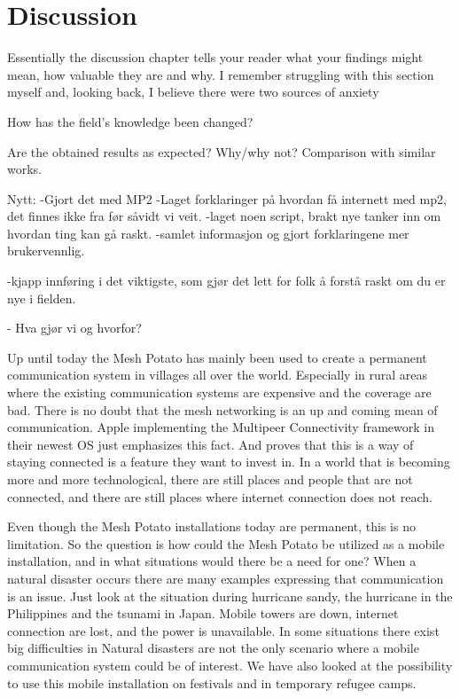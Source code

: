 \chapter{Discussion}
\label{chp:discussion} 

Essentially the discussion chapter tells your reader what your findings might mean, how valuable they are and why. I remember struggling with this section myself and, looking back, I believe there were two sources of anxiety

How has the field's knowledge been changed?

Are the obtained results as expected? Why/why not?
Comparison with similar works. 

Nytt:
-Gjort det med MP2
-Laget forklaringer på hvordan få internett med mp2, det finnes ikke fra før såvidt vi veit. 
-laget noen script, brakt nye tanker inn om hvordan ting kan gå raskt. 
-samlet informasjon og gjort forklaringene mer brukervennlig.

-kjapp innføring i det viktigste, som gjør det lett for folk å forstå raskt om du er nye i fielden. 

- Hva gjør vi og hvorfor?

Up until today the Mesh Potato has mainly been used to create a permanent communication system in villages all over the world. Especially in rural areas where the existing communication systems are expensive and the coverage are bad. There is no doubt that the mesh networking is an up and coming mean of communication. Apple implementing the Multipeer Connectivity framework in their newest OS just emphasizes this fact. And proves that this is a way of staying connected is a feature they want to invest in. In a world that is becoming more and more technological, there are still places and people that are not connected, and there are still places where internet connection does not reach. 

Even though the Mesh Potato installations today are permanent, this is no limitation. So the question is how could the Mesh Potato be utilized as a mobile installation, and in what situations would there be a need for one? When a natural disaster occurs there are many examples expressing that communication is an issue. Just look at the situation during hurricane sandy, the hurricane in the Philippines and the tsunami in Japan. Mobile towers are down, internet connection are lost, and the power is unavailable. In some situations there exist big difficulties in  Natural disasters are not the only scenario where a mobile communication system could be of interest. We have also looked at the possibility to use this mobile installation on festivals and in temporary refugee camps. 

